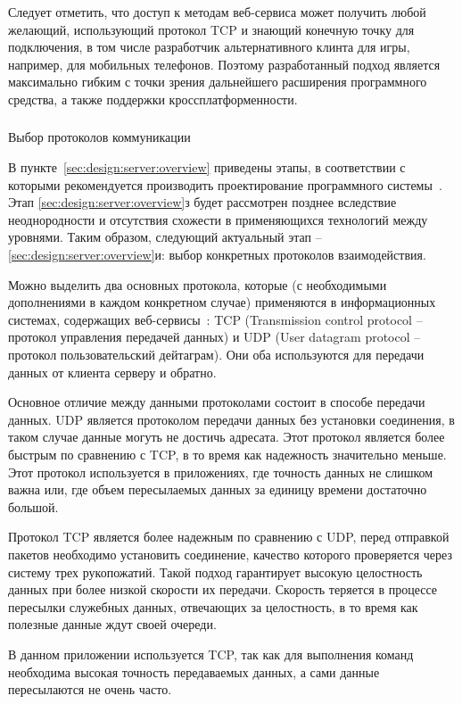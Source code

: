 Следует отметить, что доступ к методам веб-сервиса может получить любой желающий, использующий протокол TCP и знающий конечную точку для подключения, 
в том числе разработчик альтернативного клинта для игры, например, для мобильных телефонов.
Поэтому разработанный подход является максимально гибким с точки зрения дальнейшего расширения программного средства, а также поддержки кроссплатформенности.

\subsubsection{} Выбор протоколов коммуникации
\label{sec:design:server:protocols}

В пункте~\ref{sec:design:server:overview} приведены этапы, в соответствии с которыми рекомендуется производить проектирование программного 
системы~\cite{application_architecture_guide}. Этап \ref{sec:design:server:overview}з будет рассмотрен позднее вследствие неоднородности и 
отсутствия схожести в применяющихся технологий между уровнями. Таким образом, следующий актуальный этап -- \ref{sec:design:server:overview}и: выбор 
конкретных протоколов взаимодействия.

Можно выделить два основных протокола, которые (с необходимыми дополнениями в каждом конкретном случае) применяются в информационных системах, 
содержащих веб-сервисы~\cite{application_architecture_guide}: TCP (Transmission control protocol -- протокол управления передачей данных) и 
UDP (User datagram protocol -- протокол пользовательский дейтаграм). Они оба используются для передачи данных от клиента серверу и обратно.

Основное отличие между данными протоколами состоит в способе передачи данных. UDP является протоколом передачи данных без установки соединения, в таком случае
данные могуть не достичь адресата. Этот протокол является более быстрым по сравнению с TCP, в то время как надежность значительно меньше. Этот протокол используется
в приложениях, где точность данных не слишком важна или, где объем пересылаемых данных за единицу времени достаточно большой.

Протокол TCP является более надежным по сравнению с UDP, перед отправкой пакетов необходимо установить соединение, качество которого проверяется через систему трех рукопожатий.
Такой подход гарантирует высокую целостность данных при более низкой скорости их передачи. Скорость теряется в процессе пересылки служебных данных, отвечающих за целостность, в то
время как полезные данные ждут своей очереди.

В данном приложении используется TCP, так как для выполнения команд необходима высокая точность передаваемых данных, а сами данные пересылаются не очень часто.
